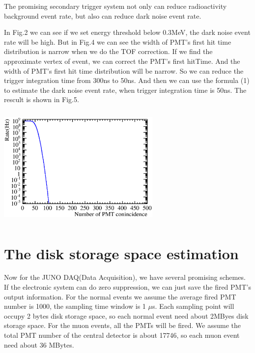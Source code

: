 \documentclass[a4paper,10pt,twoside]{paper}
\begin{document}
	\begin{multicols}{2}


		The promising secondary trigger system not only can
		reduce radioactivity background event rate, but also can
		reduce dark noise event rate.


		In Fig.2 we can see if we set energy threshold below
		0.3MeV, the dark noise event rate will be high. But in
		Fig.4 we can see the width of PMT's first hit time distribution
		is narrow when we do the TOF correction.
		If we find the approximate vertex of
		event, we can correct the PMT's first hitTime. And the
		width of PMT's first hit time distribution will be narrow.
		So we can reduce the trigger integration time from 300ns
		to 50ns. And then we can use the formula (1) to estimate
		the dark noise event rate, when trigger integration time
		is 50ns. The rescult is shown in Fig.5.


		\begin{center}
			\includegraphics[width=8cm,height=6cm]{Noise_rate_50kHz_50ns.eps}
		\end{center}


		\section{The disk storage space estimation}
		Now for the JUNO DAQ(Data Acquisition), we have several promising schemes. 
		If the electronic system can do zero suppression, we can just
		save the fired PMT's output information.
		For the normal
		events we assume the average fired PMT number is 1000, the sampling time window 
		is 1 $\mu$s. Each sampling point will occupy 2 bytes disk storage space, so each
		normal event need about 2MByes disk storage space. For the muon events, all the 
		PMTs will be fired. We assume the total PMT number of the central detector is about 
		17746, so each muon event need about 36 MBytes.


\end{multicols}
\end{document}

